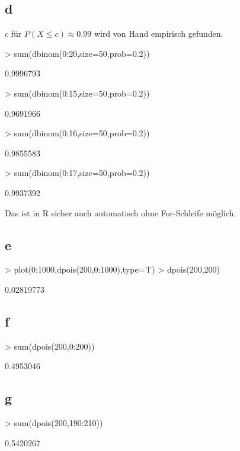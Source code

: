 \subsection{d}
$c$ für $P(X \leq c) \approx 0.99$ wird von Hand empirisch gefunden. 
\begin{Schunk}
\begin{Sinput}
> sum(dbinom(0:20,size=50,prob=0.2))
\end{Sinput}
\begin{Soutput}
[1] 0.9996793
\end{Soutput}
\begin{Sinput}
> sum(dbinom(0:15,size=50,prob=0.2))
\end{Sinput}
\begin{Soutput}
[1] 0.9691966
\end{Soutput}
\begin{Sinput}
> sum(dbinom(0:16,size=50,prob=0.2))
\end{Sinput}
\begin{Soutput}
[1] 0.9855583
\end{Soutput}
\begin{Sinput}
> sum(dbinom(0:17,size=50,prob=0.2))
\end{Sinput}
\begin{Soutput}
[1] 0.9937392
\end{Soutput}
\end{Schunk}
Das ist in R sicher auch automatisch ohne For-Schleife möglich. 

\subsection{e}
\begin{Schunk}
\begin{Sinput}
> plot(0:1000,dpois(200,0:1000),type='l')
> dpois(200,200)
\end{Sinput}
\begin{Soutput}
[1] 0.02819773
\end{Soutput}
\end{Schunk}

\subsection{f}
\begin{Schunk}
\begin{Sinput}
> sum(dpois(200,0:200))
\end{Sinput}
\begin{Soutput}
[1] 0.4953046
\end{Soutput}
\end{Schunk}

\subsection{g}
\begin{Schunk}
\begin{Sinput}
> sum(dpois(200,190:210))
\end{Sinput}
\begin{Soutput}
[1] 0.5420267
\end{Soutput}
\end{Schunk}
